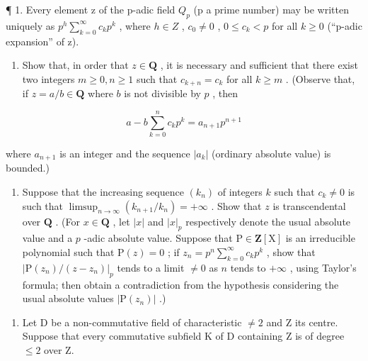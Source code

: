 
¶ 1. Every element z of the p-adic field \(Q_{p}\) (p a prime number) may be written uniquely as \(p^{h}\sum_{k=0}^{\infty}c_{k}p^{k}\) , where \(h\in Z\) , \(c_{0}\neq0\) , \(0\leqslant c_{k}<p\) for all \(k\geqslant0\) (``p-adic expansion'' of z).

\begin{enumerate}
\def\labelenumi{(\alph{enumi})}
\tightlist
\item
  Show that, in order that \(z \in \mathbf{Q}\) , it is necessary and sufficient that there exist two integers \(m \geqslant 0, n \geqslant 1\) such that \(c_{k+n} = c_k\) for all \(k \geqslant m\) . (Observe that, if \(z = a / b \in \mathbf{Q}\) where \(b\) is not divisible by \(p\) , then
\end{enumerate}

\[
a - b \sum_ {k = 0} ^ {n} c _ {k} p ^ {k} = a _ {n + 1} p ^ {n + 1}
\]

where \(a_{n+1}\) is an integer and the sequence \(|a_k|\) (ordinary absolute value) is bounded.)

\begin{enumerate}
\def\labelenumi{(\alph{enumi})}
\setcounter{enumi}{1}
\tightlist
\item
  Suppose that the increasing sequence \((k_n)\) of integers \(k\) such that \(c_k \neq 0\) is such that \(\limsup_{n \to \infty} (k_{n+1}/k_n) = +\infty\) . Show that \(z\) is transcendental over \(\mathbf{Q}\) . (For \(x \in \mathbf{Q}\) , let \(|x|\) and \(|x|_p\) respectively denote the usual absolute value and a \(p\) -adic absolute value. Suppose that \(\mathrm{P} \in \mathbf{Z}[\mathrm{X}]\) is an irreducible polynomial such that \(\mathrm{P}(z) = 0\) ; if \(z_n = p^n \sum_{k=0}^{\infty} c_k p^k\) , show that \(|\mathrm{P}(z_n)/(z - z_n)|_p\) tends to a limit \(\neq 0\) as \(n\) tends to \(+\infty\) , using Taylor's formula; then obtain a contradiction from the hypothesis considering the usual absolute values \(|\mathrm{P}(z_n)|\) .)
\end{enumerate}

\begin{enumerate}
\def\labelenumi{\arabic{enumi}.}
\setcounter{enumi}{1}
\tightlist
\item
  Let D be a non-commutative field of characteristic \(\neq2\) and Z its centre. Suppose that every commutative subfield K of D containing Z is of degree \(\leqslant2\) over Z.
\end{enumerate}

